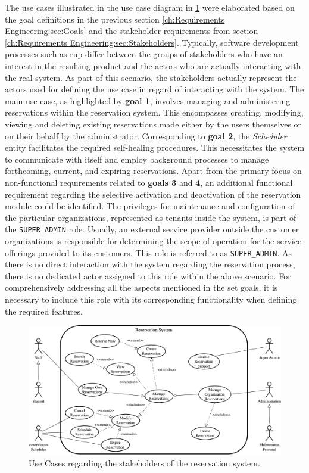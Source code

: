 The use cases illustrated in the use case diagram in \ref{fig:use-cases} were elaborated based on the goal definitions in the previous section \ref{ch:Requirements Engineering:sec:Goals} and the stakeholder requirements from section \ref{ch:Requirements Engineering:sec:Stakeholders}.
Typically, software development processes such as \acrshort{rup} \cite{kruchten_rational_1999} differ between the groups of stakeholders who have an interest in the resulting product and the actors who are actually interacting with the real system. 
As part of this scenario, the stakeholders actually represent the actors used for defining the use case in regard of interacting with the system.
The main use case, as highlighted by \textbf{goal 1}, involves managing and administering reservations within the reservation system. This encompasses creating, modifying, viewing and deleting existing reservations made either by the users themselves or on their behalf by the administrator.
Corresponding to \textbf{goal 2}, the \textit{Scheduler} entity facilitates the required self-healing procedures. This necessitates the system to communicate with itself and employ background processes to manage forthcoming, current, and expiring reservations.
Apart from the primary focus on non-functional requirements related to \textbf{goals 3} and \textbf{4}, an additional functional requirement regarding the selective activation and deactivation of the reservation module could be identified.
The privileges for maintenance and configuration of the particular organizations, represented as tenants inside the system, is part of the \verb|SUPER_ADMIN| role.
Usually, an external service provider outside the customer organizations is responsible for determining the scope of operation for the service offerings provided to its customers. This role is referred to as \verb|SUPER_ADMIN|. As there is no direct interaction with the system regarding the reservation process, there is no dedicated actor assigned to this role within the above scenario.
For comprehensively addressing all the aspects mentioned in the set goals, it is necessary to include this role with its corresponding functionality when defining the required features.

\begin{figure}[h]
    \centering
    \includegraphics[scale=0.4]{resources/images/main/2_requirements_engineering/UseCases.png}
    \caption{Use Cases regarding the stakeholders of the reservation system.}
    \label{fig:use-cases}
\end{figure}
